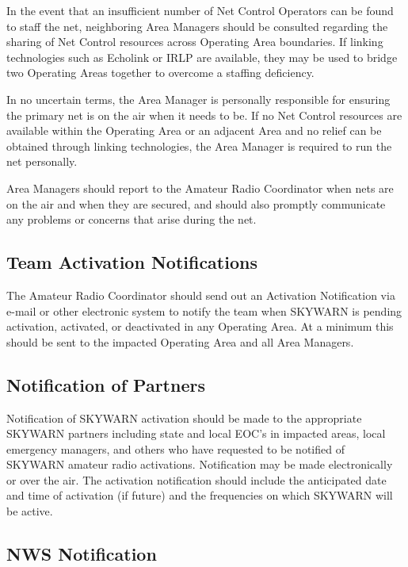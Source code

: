 \documentclass[pdflatex,letterpaper,twoside,12pt]{book}
\begin{document}
In the event that an insufficient number of Net Control Operators can be found to staff the net, neighboring Area Managers should be consulted regarding the sharing of Net Control resources across Operating Area boundaries.  If linking technologies such as Echolink or IRLP are available, they may be used to bridge two Operating Areas together to overcome a staffing deficiency.

In no uncertain terms, the Area Manager is personally responsible for ensuring the primary net is on the air when it needs to be.  If no Net Control resources are available within the Operating Area or an adjacent Area and no relief can be obtained through linking technologies, the Area Manager is required to run the net personally.

Area Managers should report to the Amateur Radio Coordinator when nets are on the air and when they are secured, and should also promptly communicate any problems or concerns that arise during the net.

\subsection{Team Activation Notifications}\label{team-notification}

The Amateur Radio Coordinator should send out an Activation Notification via e-mail or other electronic system to notify the team when SKYWARN is pending activation, activated, or deactivated in any Operating Area.  At a minimum this should be sent to the impacted Operating Area and all Area Managers.

\subsection{Notification of Partners}

Notification of SKYWARN activation should be made to the appropriate SKYWARN partners including state and local EOC's in impacted areas, local emergency managers, and others who have requested to be notified of SKYWARN amateur radio activations.  Notification may be made electronically or over the air. The activation notification should include the anticipated date and time of activation (if future) and the frequencies on which SKYWARN will be active.

\subsection{NWS Notification}
\end{document}
